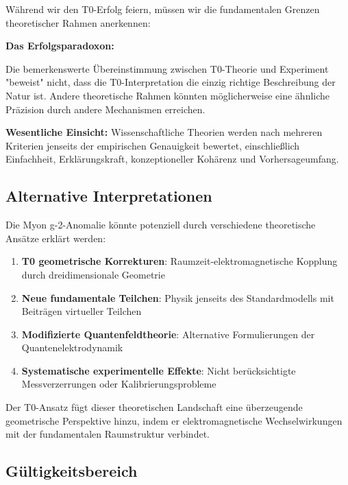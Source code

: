 \documentclass[12pt,a4paper]{report}
\begin{document}
	Während wir den T0-Erfolg feiern, müssen wir die fundamentalen Grenzen theoretischer Rahmen anerkennen:
	
	\begin{tcolorbox}[colback=yellow!5!white,colframe=orange!75!black,title=Theoretische Bescheidenheit]
		\textbf{Das Erfolgsparadoxon:}
		
		Die bemerkenswerte Übereinstimmung zwischen T0-Theorie und Experiment "beweist" nicht, dass die T0-Interpretation die einzig richtige Beschreibung der Natur ist. Andere theoretische Rahmen könnten möglicherweise eine ähnliche Präzision durch andere Mechanismen erreichen.
		
		\textbf{Wesentliche Einsicht:} Wissenschaftliche Theorien werden nach mehreren Kriterien jenseits der empirischen Genauigkeit bewertet, einschließlich Einfachheit, Erklärungskraft, konzeptioneller Kohärenz und Vorhersageumfang.
	\end{tcolorbox}
	
	\subsection{Alternative Interpretationen}
	\label{subsec:alternative_interpretations}
	
	Die Myon g-2-Anomalie könnte potenziell durch verschiedene theoretische Ansätze erklärt werden:
	\begin{enumerate}
		\item \textbf{T0 geometrische Korrekturen}: Raumzeit-elektromagnetische Kopplung durch dreidimensionale Geometrie
		\item \textbf{Neue fundamentale Teilchen}: Physik jenseits des Standardmodells mit Beiträgen virtueller Teilchen
		\item \textbf{Modifizierte Quantenfeldtheorie}: Alternative Formulierungen der Quantenelektrodynamik
		\item \textbf{Systematische experimentelle Effekte}: Nicht berücksichtigte Messverzerrungen oder Kalibrierungsprobleme
	\end{enumerate}
	
	Der T0-Ansatz fügt dieser theoretischen Landschaft eine überzeugende geometrische Perspektive hinzu, indem er elektromagnetische Wechselwirkungen mit der fundamentalen Raumstruktur verbindet.
	
	\subsection{Gültigkeitsbereich}
	\label{subsec:scope_validity}
	
\end{document}
